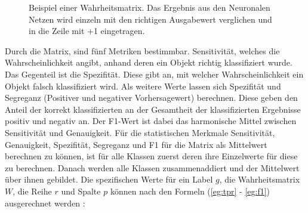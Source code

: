 \begin{figure}[t]
\begin{center}
\caption[Beispiel einer Warheitsmatrix $W$]{Beispiel einer Wahrheitsmatrix. Das Ergebnis aus den Neuronalen Netzen wird einzeln mit den richtigen Ausgabewert verglichen und in die Zeile mit +1 eingetragen.}\label{cap:conv_matrix}
\end{center}
\end{figure}\label{fig:conv_matrix}

Durch die Matrix, sind fünf Metriken bestimmbar. Sensitivität, welches die Wahrscheinlichkeit angibt, anhand deren ein Objekt richtig klassifiziert wurde. Das Gegenteil ist die Spezifität. Diese gibt an, mit welcher Wahrscheinlichkeit ein Objekt falsch klassifiziert wird. Als weitere Werte lassen sich Spezifität und Segreganz (Positiver und negativer Vorhersagewert) berechnen. Diese geben den Anteil der korrekt klassifizierten an der Gesamtheit der klassifizierten Ergebnisse positiv und negativ an. Der F1-Wert ist dabei das harmonische Mittel zwischen Sensitivität und Genauigkeit. Für die statistischen Merkmale Sensitivität, Genauigkeit, Spezifität, Segreganz und F1 für die Matrix als Mittelwert berechnen zu können, ist für alle Klassen zuerst deren ihre Einzelwerte für diese zu berechnen. Danach werden alle Klassen zusammenaddiert und der Mittelwert über ihnen gebildet. Die spezifischen Werte für ein Label $g$, die Wahrheitsmatrix $W$, die Reihe $r$ und Spalte $p$ können nach den Formeln (\ref{eg:tpr} - \ref{eg:f1}) ausgerechnet werden \cite{matrix_calc_paper}:


